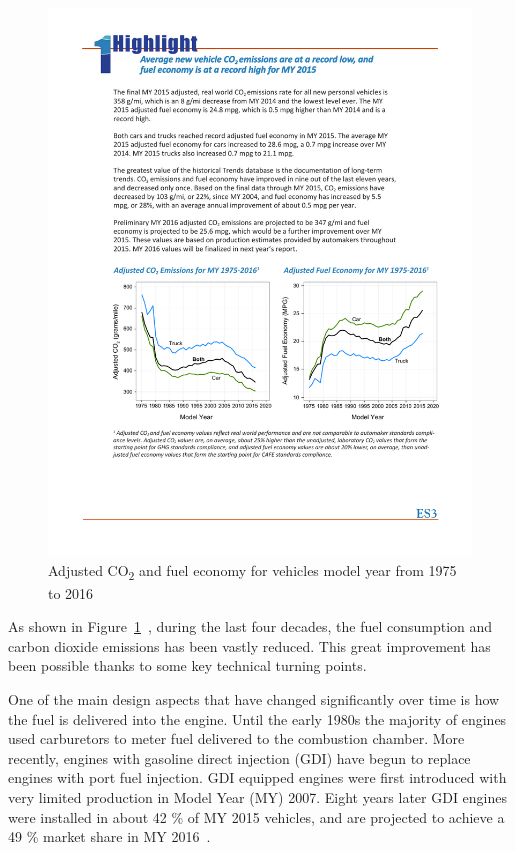 \begin{figure}[ht]
  \centering
  \includegraphics[width=\textwidth]{figures/review/adj_fuel_economy.pdf}
  \caption{Adjusted CO\textsubscript{2} and fuel economy for vehicles model year from 1975 to 2016\label{fig:adj_fuel_economy} }
\end{figure}

As shown in Figure~\ref{fig:adj_fuel_economy}~\cite{EPA2016}, during the last four decades, the fuel consumption and carbon dioxide emissions has been vastly reduced. This great improvement has been possible thanks to some key technical turning points.

One of the main design aspects that have changed significantly over time is how the fuel is delivered into the engine. Until the early 1980s the majority of engines used carburetors to meter fuel delivered to the combustion chamber. More recently, engines with gasoline direct injection (GDI) have begun to replace engines with port fuel injection. GDI equipped engines were first introduced with very limited production in Model Year (MY) 2007. Eight years later GDI engines were installed in about 42 \% of MY 2015 vehicles, and are projected to achieve a 49 \% market share in MY 2016~\cite{EPA2016}.

